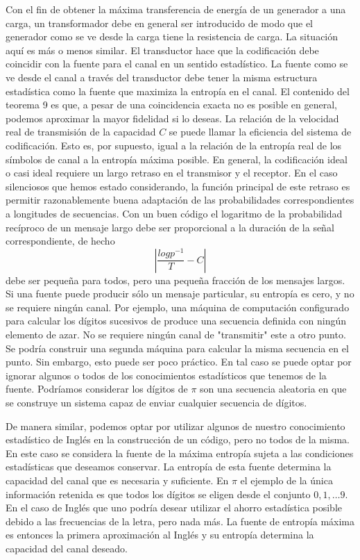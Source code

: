 Con el fin de obtener la m\'axima transferencia de energ\'ia de un
generador a una carga, un transformador debe en general ser
introducido de modo que el generador como se ve desde la carga tiene
la resistencia de carga. La situaci\'on aqu\'i es m\'as o menos
similar. El transductor hace que la codificaci\'on debe coincidir con
la fuente para el canal en un sentido estad\'istico. La fuente como se
ve desde el canal a trav\'es del transductor debe tener la misma
estructura estad\'istica como la fuente que maximiza la entrop\'ia en
el canal. El contenido del teorema 9 es que, a pesar de una
coincidencia exacta no es posible en general, podemos aproximar la
mayor fidelidad si lo deseas. La relaci\'on de la velocidad real de
transmisi\'on de la capacidad $C$ se puede llamar la eficiencia del
sistema de codificaci\'on. Esto es, por supuesto, igual a la
relaci\'on de la entrop\'ia real de los s\'imbolos de canal a la
entrop\'ia m\'axima posible. En general, la codificaci\'on ideal o
casi ideal requiere un largo retraso en el transmisor y el receptor.
En el caso silenciosos que hemos estado considerando, la funci\'on
principal de este retraso es permitir razonablemente buena
adaptaci\'on de las probabilidades correspondientes a longitudes de
secuencias. Con un buen c\'odigo el logaritmo de la probabilidad
rec\'iproco de un mensaje largo debe ser proporcional a la duraci\'on
de la se\~{n}al correspondiente, de hecho
\begin{equation}
|\frac{log p^{-1}}{T} - C |
\end{equation}
debe ser peque\~{n}a para todos, pero una peque\~{n}a fracci\'on de
los mensajes largos. Si una fuente puede producir s\'olo un mensaje
particular, su entrop\'ia es cero, y no se requiere ning\'un canal.
Por ejemplo, una m\'aquina de computaci\'on configurado para calcular
los d\'igitos sucesivos de produce una secuencia definida con ning\'un
elemento de azar. No se requiere ning\'un canal de "transmitir" este a
otro punto. Se podr\'ia construir una segunda m\'aquina para calcular
la misma secuencia en el punto. Sin embargo, esto puede ser poco
pr\'actico. En tal caso se puede optar por ignorar algunos o todos de
los conocimientos estad\'isticos que tenemos de la fuente. Podr\'iamos
considerar los d\'igitos de $\pi$ son una secuencia aleatoria en que se
construye un sistema capaz de enviar cualquier secuencia de
d\'igitos. 

De manera similar, podemos optar por utilizar algunos de nuestro
conocimiento estad\'istico de Ingl\'es en la construcci\'on de un
c\'odigo, pero no todos de la misma. En este caso se considera la
fuente de la m\'axima entrop\'ia sujeta a las condiciones
estad\'isticas que deseamos conservar. La entrop\'ia de esta fuente
determina la capacidad del canal que es necesaria y suficiente. En
$\pi$ el ejemplo de la \'unica informaci\'on retenida es que todos los
d\'igitos se eligen desde el conjunto $0,1, \ldots 9$. En el caso de
Ingl\'es que uno podr\'ia desear utilizar el ahorro estad\'istica
posible debido a las frecuencias de la letra, pero nada m\'as. La
fuente de entrop\'ia m\'axima es entonces la primera aproximaci\'on al
Ingl\'es y su entrop\'ia determina la capacidad del canal deseado.

